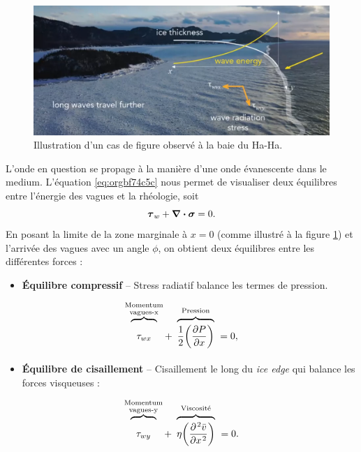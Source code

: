 \documentclass[10pt]{article}
\numberwithin{equation}{section}
\newcommand{\short}{\vphantom{pA}}
\newcommand{\tall}{\vphantom{pA^{x^x}_p}}
\newcommand{\venti}{\vphantom{\sum_x^x}}
\newcommand{\pt}{\hspace{1pt}} %
\begin{document}
\begin{figure}[htbp]
\centering
\includegraphics[width=.9\linewidth]{Figures/photos/glace-evanescente.png}
\caption{\label{fig:org64763e9}Illustration d'un cas de figure observé à la baie du Ha-Ha.}
\end{figure}

L'onde en question se propage à la manière d'une onde évanescente dans le medium.
L'équation \ref{eq:orgbf74c5c} nous permet de visualiser deux équilibres entre l'énergie des vagues et la rhéologie, soit
\begin{equation}
   \boldsymbol{\tau}_w + \divergence{\boldsymbol{\sigma}} = 0.
\end{equation}
En posant la limite de la zone marginale à \(x=0\) (comme illustré à la figure \ref{fig:org64763e9}) et l'arrivée des vagues avec un angle \(\phi\), on obtient deux équilibres entre les différentes forces :\bigskip

\begin{itemize}
\item \textbf{Équilibre compressif} -- Stress radiatif balance les termes de pression.
\end{itemize}
\begin{equation}
\label{eq:orgaa734a2}
   \overbrace{\venti\phantom{x}\tau_{wx}\phantom{x}}^{\substack{\text{Momentum}\short\\\text{vagues-x}\short}} +\ \overbrace{\venti\frac{1}{2}\qty(\pdv{P}{x})}^{\text{Pression}\tall}\ = 0,
\end{equation}

\begin{itemize}
\item \textbf{Équilibre de cisaillement} -- Cisaillement le long du \emph{ice edge} qui balance les forces visqueuses :
\end{itemize}
\begin{equation}
   \overbrace{\venti\phantom{x}\tau_{wy}\phantom{x}}^{\substack{\text{Momentum}\short\\\text{vagues-y}\short}} +\ \overbrace{\venti\eta\qty(\pdv[\pt2]{\bar{v}}{x})}^{\text{Viscosité}\tall}\ = 0.
\end{equation}
\end{document}
